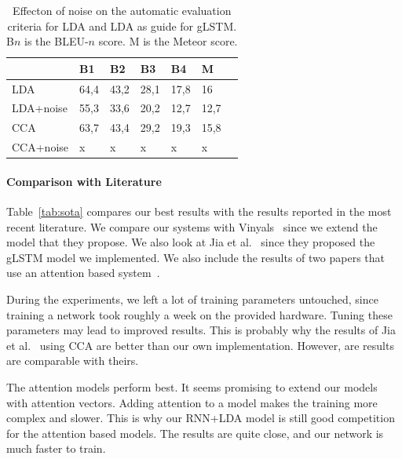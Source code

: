 \documentclass[twoside,twocolumn]{article}
\begin{document}
\begin{table}
	\centering
	\begin{tabular}{lllllll}
		~                  & B1 & B2 & B3 & B4 & M \\ \hline
		LDA   & 64,4   & 43,2   & 28,1   & 17,8 & 16 \\
		LDA+noise   & 55,3   & 33,6   & 20,2   & 12,7 & 12,7 \\ \hline
		CCA   & 63,7   & 43,4   & 29,2   & 19,3 & 15,8 \\
		CCA+noise   & x  & x   & x   & x & x \\ \hline			
	\end{tabular}
	\caption{Effecton of noise on the automatic evaluation criteria for LDA and LDA as guide for gLSTM. B$n$ is the BLEU-$n$ score. M is the Meteor score.}
	\label{table:noisy}
\end{table}



\paragraph{Comparison with Literature}
Table~\ref{tab:sota} compares our best results with the results reported in the most recent literature. We compare our systems with Vinyals~\cite{Google} since we extend the model that they propose. We also look at Jia et al.~\cite{Fernando2015} since they proposed the gLSTM model we implemented. We also include the results of two papers that use an attention based system~\cite{Jin2015, Xu2015}. 

During the experiments, we left a lot of training parameters untouched, since training a network took roughly a week on the provided hardware. Tuning these parameters may lead to improved results. This is probably why the results of Jia et al.~\cite{Fernando2015} using CCA are better than our own implementation. However, are results are comparable with theirs. 

The attention models perform best. It seems promising to extend our models with attention vectors. Adding attention to a model makes the training more complex and slower. This is why our RNN+LDA model is still good competition for the attention based models. The results are quite close, and our network is much faster to train. 
\end{document}
